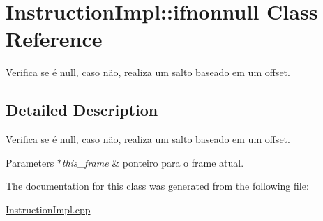 \hypertarget{class_instruction_impl_1_1ifnonnull}{}\section{Instruction\+Impl\+:\+:ifnonnull Class Reference}
\label{class_instruction_impl_1_1ifnonnull}


Verifica se é null, caso não, realiza um salto baseado em um offset.  




\subsection{Detailed Description}
Verifica se é null, caso não, realiza um salto baseado em um offset. 


\begin{DoxyParams}{Parameters}
{\em $\ast$this\+\_\+frame} & ponteiro para o frame atual.  \\
\hline
\end{DoxyParams}


The documentation for this class was generated from the following file\+:\begin{DoxyCompactItemize}
\item 
\hyperlink{_instruction_impl_8cpp}{Instruction\+Impl.\+cpp}\end{DoxyCompactItemize}

